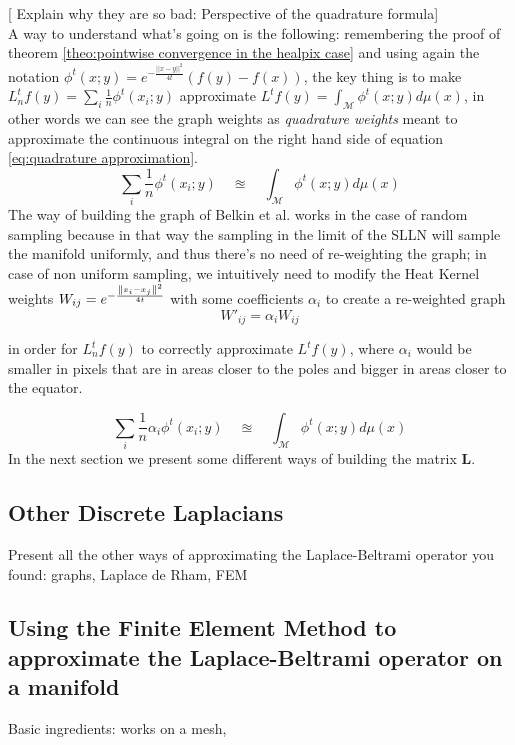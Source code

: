 [ Explain why they are so bad: Perspective of the quadrature formula]\\
A way to understand what's going on is the following: remembering the proof of theorem \ref{theo:pointwise convergence in the healpix case} and using again the notation $\phi^{t}(x ; y)=e^{-\frac{||x-y||^2}{4t}}\left(f(y)-f(x)\right)$, the key thing is to make $L_n^tf(y)=\sum_i \frac{1}{n} \phi^{t}(x_i ; y)$  approximate $L^tf(y)=\int_\mathcal M\phi^{t}(x ; y)d\mu(x)$, in other words we can see the graph weights as \textit{quadrature weights} meant to approximate the continuous integral on the right hand side of equation \ref{eq:quadrature approximation}.
\begin{equation}
\label{eq:quadrature approximation}
	\sum_i \frac{1}{n} \phi^{t}(x_i ; y) \quad \approxeq\quad \int_\mathcal M\phi^{t}(x ; y)d\mu(x)
\end{equation}
The way of building the graph of Belkin et al. works in the case of random sampling because in that way the sampling in the limit of the SLLN will sample the manifold uniformly, and thus there's no need of re-weighting the graph; in case of non uniform sampling, we intuitively need to modify the Heat Kernel weights $W_{i j}=e^{-\frac{\left\lVert x_i-x_j\right\rVert^2}{4t}}$ with some coefficients $\alpha_i$ to create a re-weighted graph 
$$
W'_{i j} = \alpha_i W_{i j}
$$

in order for $L_n^tf(y)$ to correctly approximate $L^tf(y)$, where $\alpha_i$ would be smaller in pixels that are in areas closer to the poles and bigger in areas closer to the equator. 

\begin{equation}
\label{eq:quadrature approximation 2}
\sum_i \frac{1}{n} \alpha_i \phi^{t}(x_i ; y) \quad \approxeq\quad \int_\mathcal M  \phi^{t}(x ; y)d\mu(x)
\end{equation}
In the next section we present some different ways of building the matrix $\mathbf L$.

\clearpage
\subsection{Other Discrete Laplacians}\label{sec:Chapter3: other discrete laplacians}
Present all the other ways of approximating the Laplace-Beltrami operator you found: graphs, Laplace de Rham, FEM
\subsection{Using the Finite Element Method to approximate the Laplace-Beltrami operator on a manifold}\label{sec:Chapter3: Using the Finite Element Method to approximate the Laplace-Beltrami operator on a manifold}
Basic ingredients: works on a mesh, 
